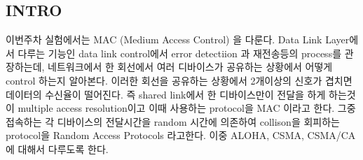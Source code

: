 \subsection*{INTRO}
이번주차 실험에서는 MAC (Medium Access Control) 을 다룬다.  Data Link Layer에서 다루는 기능인 data link control에서 error detectiion 과 재전송등의 process를 관장하는데, 네트워크에서 한 회선에서 여러 디바이스가 공유하는 상황에서 어떻게 control 하는지 알아본다. 이러한 회선을 공유하는 상황에서 2개이상의 신호가 겹치면 데이터의 수신율이 떨어진다. 즉 shared link에서 한 디바이스만이 전달을 하게 하는것이 multiple access resolution이고 이때 사용하는 protocol을 MAC 이라고 한다. 그중접속하는 각 디바이스의 전달시간을 random 시간에 의존하여 collison을 회피하는 protocol을 Random Access Protocols 라고한다. 이중 ALOHA, CSMA, CSMA/CA에 대해서 다루도록 한다.
